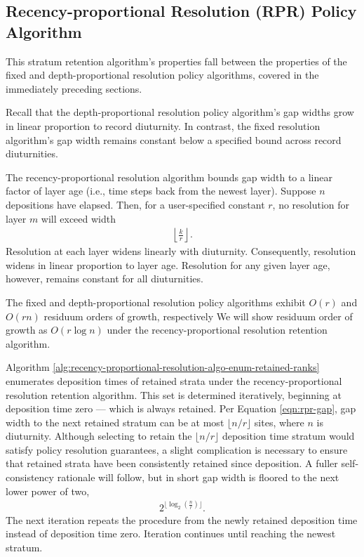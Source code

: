 \subsection{Recency-proportional Resolution (RPR) Policy Algorithm}
\label{sec:recency-proportional-resolution-algo}

This stratum retention algorithm's properties fall between the properties of the fixed and depth-proportional resolution policy algorithms, covered in the immediately preceding sections.

Recall that the depth-proportional resolution policy algorithm's gap widths grow in linear proportion to record diuturnity.
In contrast, the fixed resolution algorithm's gap width remains constant below a specified bound across record diuturnities.

The recency-proportional resolution algorithm bounds gap width to a linear factor of layer age (i.e., time steps back from the newest layer).
Suppose $n$ depositions have elapsed.
Then, for a user-specified constant $r$, no resolution for layer $m$ will exceed width
\begin{align}
  \left\lfloor \frac{k}{r} \right\rfloor.
  \label{eqn:rpr-gap}
\end{align}
Resolution at each layer widens linearly with diuturnity.
Consequently, resolution widens in linear proportion to layer age.
Resolution for any given layer age, however, remains constant for all diuturnities.

The fixed and depth-proportional resolution policy algorithms exhibit $O(r)$ and $O(rn)$ residuum orders of growth, respectively
We will show residuum order of growth as $O(r\log{n})$ under the recency-proportional resolution retention algorithm.

Algorithm \ref{alg:recency-proportional-resolution-algo-enum-retained-ranks} enumerates deposition times of retained strata under the recency-proportional resolution retention algorithm.
This set is determined iteratively, beginning at deposition time zero --- which is always retained.
Per Equation \ref{eqn:rpr-gap}, gap width to the next retained stratum can be at most $\lfloor n/r \rfloor$ sites, where $n$ is diuturnity.
Although selecting to retain the $\lfloor n/r \rfloor$ deposition time stratum would satisfy policy resolution guarantees, a slight complication is necessary to ensure that retained strata have been consistently retained since deposition.
A fuller self-consistency rationale will follow, but in short gap width is floored to the next lower power of two,
\begin{align*}
  2^{\lfloor \log_{2}\left(\frac{n}{r}\right) \rfloor}.
\end{align*}
The next iteration repeats the procedure from the newly retained deposition time instead of deposition time zero.
Iteration continues until reaching the newest stratum.

